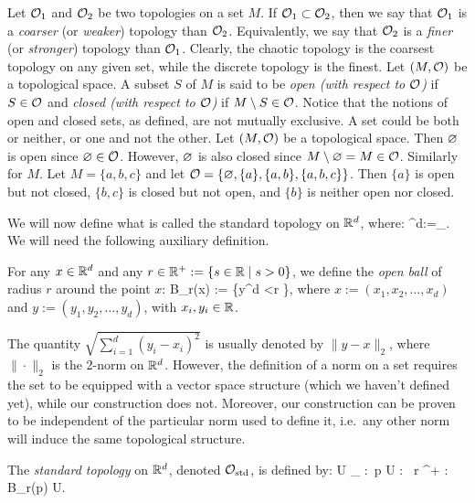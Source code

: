 \bd
Let $\mathcal{O}_1$ and $\mathcal{O}_2$ be two topologies on a set $M$. If $\mathcal{O}_1 \subset \mathcal{O}_2$, then we say that $\mathcal{O}_1$ is a \emph{coarser} (or \emph{weaker}) topology than $\mathcal{O}_2$. Equivalently, we say that $\mathcal{O}_2$ is a \emph{finer} (or \emph{stronger}) topology than $\mathcal{O}_1$.
\ed
Clearly, the chaotic topology is the coarsest topology on any given set, while the discrete topology is the finest.
\bd
Let $(M,\mathcal{O})$ be a topological space. A subset $S$ of $M$ is said to be \emph{open (with respect to $\mathcal{O}$)} if $S \in \mathcal{O}$ and \emph{closed (with respect to $\mathcal{O}$)} if $M\setminus S \in \mathcal{O}$. 
\ed
Notice that the notions of open and closed sets, as defined, are not mutually exclusive. A set could be both or neither, or one and not the other.
\be
Let $(M,\mathcal{O})$ be a topological space. Then $\varnothing$ is open since $\varnothing \in \mathcal{O}$. However, $\varnothing$ is also closed since $M\setminus \varnothing = M \in \mathcal{O}$. Similarly for $M$.
\ee
\be
Let $M = \{a,b,c\}$ and let $\mathcal{O}=\{\varnothing,\{a\},\{a,b\},\{a,b,c\}\}$. Then $\{a\}$ is open but not closed, $\{b,c\}$ is closed but not open, and $\{b\}$ is neither open nor closed.
\ee





We will now define what is called the standard topology on $\mathbb{R}^d$, where:
\bse
\R^d:=\underbrace{\R\times\R\times\cdots\times\R}_.
\ese
We will need the following auxiliary definition.

\bd
For any $x\in\mathbb{R}^d$ and any $r \in \mathbb{R}^+:=\{s\in\mathbb{R}\mid s>0\}$, we define the \emph{open ball} of radius $r$ around the point $x$:
\bse
B_r(x) := \bigl\{y\in \R^d \mid \textstyle{} <r \bigr\},
\ese
where $x:=(x_1,x_2,\ldots,x_d)$ and $y:=(y_1,y_2,\ldots,y_d)$, with $x_i,y_i\in\mathbb{R}$.
\ed

\br
The quantity $\sqrt{\sum_{i=1}^d (y_i-x_i)^2}$ is usually denoted by $\|y-x\|_2$, where $\|\cdot\|_2$ is the 2-norm on $\mathbb{R}^d$. However, the definition of a norm on a set requires the set to be equipped with a vector space structure (which we haven't defined yet), while our construction does not. Moreover, our construction can be proven to be independent of the particular norm used to define it, i.e.\ any other norm will induce the same topological structure. 
\er

\bd
The \emph{standard topology} on $\mathbb{R}^d$, denoted $\mathcal{O}_\mathrm{std}$, is defined by:
\bse
U \in \cO_ :\eqv \forall \, p \in U : \exists \, r \in \R^+ : B_r(p) \se U.
\ese
\ed

